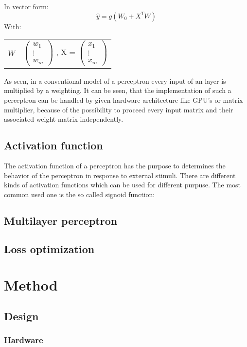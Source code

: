 \documentclass{report}
\makeatletter
\numberwithin{equation}{section}
\newenvironment{conditions}
{\par\vspace{\abovedisplayskip}
\noindent\begin{tabular}{>{$}l<{$} @{${}={}$} l}}
        {\end{tabular}\par\vspace{\belowdisplayskip}}
\makeatother
\begin{document}
In vector form:
\begin{equation}
    \hat y = g(W_0 + X^TW)
\end{equation}
With:
\begin{conditions}
    W & $\begin{pmatrix} w_1 \\ \vdots \\ w_m \end{pmatrix}$ , X = $\begin{pmatrix} x_1 \\ \vdots \\ x_m \end{pmatrix}$
\end{conditions}
As seen, in a conventional model of a perceptron every input of an
layer is multiplied by a weighting. It can be seen, that the implementation
of such a perceptron can be handled by given hardware architecture like GPU's
or matrix multiplier, because of the possibility to proceed every input matrix
and their associated weight matrix independently.

\section{Activation function}
The activation function of a perceptron has the purpose to determines the
behavior of the perceptron in response to external stimuli. There are different
kinds of activation functions which can be used for different purpuse. The most
common used one is the so called signoid function:

\section{Multilayer perceptron}

\section{Loss optimization}

\chapter{Method}

\section{Design}

\subsection{Hardware}
\end{document}
